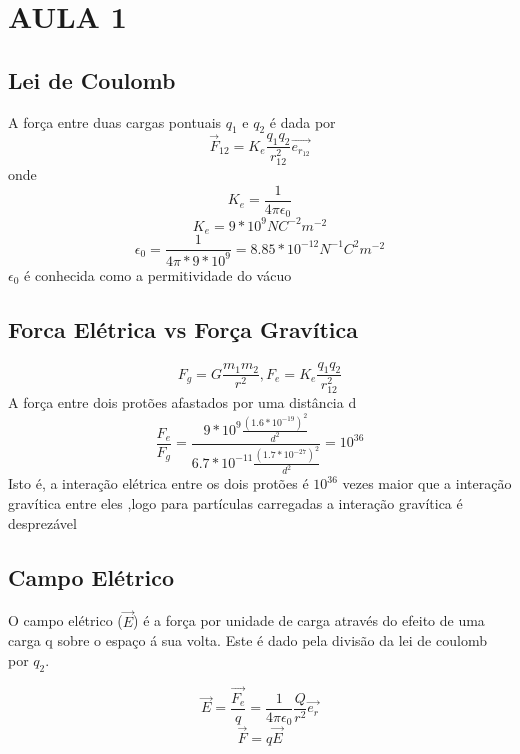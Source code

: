 \documentclass[a4paper]{article}
\begin{document}
 

\section{AULA 1}

\subsection{Lei de Coulomb}
\begin{center}
\end{center}

A força entre duas cargas pontuais $q_{1}$ e $q_{2}$ é dada por
\[ \vec{F}_{12} = K_e \frac{q_1 q_2}{r_{12}^2} \vec{e_{r_{12}}}\] 
onde 
\[K_e=\frac{1}{4\pi\epsilon_0} \]
\[ K_e =9*10^9 NC^{-2}m^{-2} \]
\[ \epsilon_0 = \frac{1}{4\pi*9*10^9} 
= 8.85*10^{-12} N^{-1}C^2m^{-2}\]
$\epsilon_0$ é conhecida como a permitividade do vácuo


\subsection{Forca Elétrica vs Força Gravítica}
\[F_g = G \frac{m_1m_2}{r^2},     F_e = K_e \frac{q_1 q_2}{r_{12}^2}\]
A força entre dois protões afastados por uma distância d
\[\frac{F_e}{F_g}= \frac{9*10^9 \frac{{(1.6*10^{-19})}^2}{d^2}}{6.7*10^{-11} \frac{{(1.7*10^{-27})}^2}{d^2}} = 10^{36}\] 
Isto é, a interação elétrica entre os dois protões é $10^{36}$
 vezes maior que a interação gravítica entre eles
,logo para partículas carregadas a interação gravítica é desprezável

\subsection{Campo Elétrico}
O campo elétrico ($\vec{E}$) é a força por unidade de carga através do 
efeito de uma carga q sobre o espaço á sua volta.
Este é dado pela divisão da lei de coulomb por $q_2$.
\begin{center}
\end{center}
\[\vec{E} = \frac{\vec{F_e}}{q} = \frac{1}{4\pi\epsilon_0} \frac{Q}{r^2}\vec{e_r}\]
\[\vec{F}= q\vec{E}\]
\end{document}
